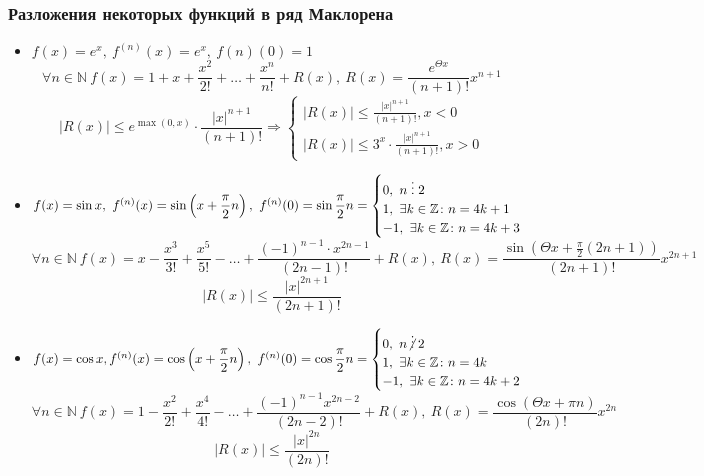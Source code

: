 \subsubsection{Разложения некоторых функций в ряд Маклорена}
\begin{itemize}
	\item $f(x) = e^x, \
	f^{(n)}(x) = e^x, \
	f{(n)}(0) = 1$
	\begin{equation*}
	\forall n \in \mathbb N \ f(x) = 1 + x + \frac{x^2}{2!} + \ldots + \frac{x^n}{n!} + R(x), \
	R(x) = \frac{e^{\Theta x}}{(n + 1)!} x^{n + 1}
	\end{equation*}
	\begin{equation*}
	|R(x)| \leqslant e^{\max(0, x)} \cdot \frac{|x|^{n + 1}}{(n + 1)!} \Rightarrow
	\begin{cases}
	\displaystyle |R(x)| \leqslant \frac{|x|^{n + 1}}{(n + 1)!}, x < 0 \\
	\displaystyle |R(x)| \leqslant 3^x \cdot \frac{|x|^{n + 1}}{(n + 1)!}, x > 0
	\end{cases}
	\end{equation*}
	
	\item $f(x) = \sin x, \
	f^{(n)}(x) = \sin \left( x + \dfrac\pi{2} n \right), \
	f^{(n)}(0) = \sin \dfrac\pi{2} n =
	\begin{cases}
	0, \ n \;\vdots\; 2 \\
	1, \ \exists k \in \mathbb Z \colon n = 4k + 1 \\
	-1, \ \exists k \in \mathbb Z \colon n = 4k + 3
	\end{cases}$
	\begin{equation*}
	\forall n \in \mathbb N \ f(x) = x - \frac{x^3}{3!} + \frac{x^5}{5!} - \ldots + \frac{(-1)^{n-1} \cdot x^{2n-1}}{(2n - 1)!} + R(x), \
	R(x) = \frac{\sin \left( \Theta x + \frac\pi{2} (2n + 1) \right)}{(2n + 1)!} x^{2n+1}
	\end{equation*}
	\begin{equation*}
	|R(x)| \leqslant \frac{|x|^{2n+1}}{(2n + 1)!}
	\end{equation*}
	
	\item $f(x) = \cos x,
	f^{(n)}(x) = \cos \left( x + \dfrac\pi{2} n \right), \
	f^{(n)}(0) = \cos \dfrac\pi{2} n =
	\begin{cases}
	0, \ n \notmult 2 \\
	1, \ \exists k \in \mathbb Z \colon n = 4k \\
	-1, \ \exists k \in \mathbb Z \colon n = 4k + 2
	\end{cases}$
	\begin{equation*}
	\forall n \in \mathbb N \ f(x) = 1 - \frac{x^2}{2!} + \frac{x^4}{4!} - \ldots + \frac{(-1)^{n-1} x^{2n-2}}{(2n - 2)!} + R(x), \
	R(x) = \frac{\cos (\Theta x + \pi n)}{(2n)!} x^{2n}
	\end{equation*}
	\begin{equation*}
	|R(x)| \leqslant \frac{|x|^{2n}}{(2n)!}
	\end{equation*}
	

\end{itemize}

